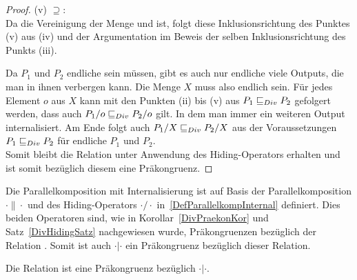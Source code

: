 \begin{proof}
  (v) \glqq $\supseteq$\grqq{}:\\
  Da \QDT{} die Vereinigung der Menge \StQT{} und \EDT{} ist, folgt diese
  Inklusionsrichtung des Punktes (v) aus (iv) und der Argumentation im Beweis
  der selben Inklusionsrichtung des Punkts (iii).

  Da $P_1$ und $P_2$ endliche sein müssen, gibt es auch nur endliche viele
  Outputs, die man in ihnen verbergen kann. Die Menge $X$ muss also endlich
  sein. Für jedes Element $o$ aus $X$ kann mit den Punkten (ii) bis (v) aus
  $P_1 \sqsubseteq  _{Div} P_2$ gefolgert werden, dass auch $P_1/o \sqsubseteq  _{Div} P_2/o$ gilt. In dem
  man immer ein weiteren Output internalisiert. Am Ende folgt auch $P_1/X \sqsubseteq  _{Div}
  P_2/X$ aus der Voraussetzungen $P_1 \sqsubseteq  _{Div} P_2$ für endliche \MEIO{} $P_1$ und
  $P_2$.\\
  Somit bleibt die Relation \DRel{} unter Anwendung des Hiding-Operators
  erhalten und ist somit bezüglich diesem eine Präkongruenz.
\end{proof}

Die Parallelkomposition mit Internalisierung ist auf Basis der
Parallelkomposition $\cdot \|\cdot$ und des Hiding-Operators $\cdot /\cdot$
in~\ref{DefParallelkompInternal} definiert. Dies beiden Operatoren sind, wie in
Korollar~\ref{DivPraekonKor} und Satz~\ref{DivHidingSatz} nachgewiesen wurde,
Präkongruenzen bezüglich der Relation \DRel{}. Somit ist auch $\cdot |\cdot$
ein Präkongruenz bezüglich dieser Relation.

\begin{Kor}
  Die Relation \DRel{} ist eine Präkongruenz bezüglich $\cdot |\cdot$.
\end{Kor}
